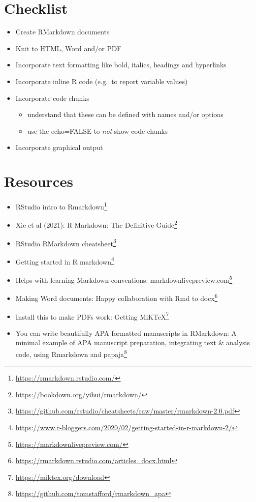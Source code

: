 \documentclass[
  12pt,
  a5paper,
]{book}
\DeclareRobustCommand{\href}[2]{#2\footnote{\url{#1}}}
\providecommand{\tightlist}{%
  \setlength{\itemsep}{0pt}\setlength{\parskip}{0pt}}
\begin{document}
\hypertarget{checklist-5}{%
\section{Checklist}\label{checklist-5}}

\begin{itemize}
\tightlist
\item
  Create RMarkdown documents
\item
  Knit to HTML, Word and/or PDF
\item
  Incorporate text formatting like bold, italics, headings and hyperlinks
\item
  Incorporate inline R code (e.g.~to report variable values)
\item
  Incorporate code chunks

  \begin{itemize}
  \tightlist
  \item
    understand that these can be defined with names and/or options
  \item
    use the echo=FALSE to \emph{not} show code chunks
  \end{itemize}
\item
  Incorporate graphical output
\end{itemize}

\hypertarget{resources-6}{%
\section{Resources}\label{resources-6}}

\begin{itemize}
\tightlist
\item
  \href{https://rmarkdown.rstudio.com/}{RStudio intro to Rmarkdown}
\item
  Xie et al (2021): \href{https://bookdown.org/yihui/rmarkdown/}{R Markdown: The Definitive Guide}
\item
  \href{https://github.com/rstudio/cheatsheets/raw/master/rmarkdown-2.0.pdf}{RStudio RMarkdown cheatsheet}
\item
  \href{https://www.r-bloggers.com/2020/02/getting-started-in-r-markdown-2/}{Getting started in R markdown}
\item
  Helps with learning Markdown conventions: \href{https://markdownlivepreview.com/}{markdownlivepreview.com}
\item
  Making Word documents: \href{https://rmarkdown.rstudio.com/articles_docx.html}{Happy collaboration with Rmd to docx}
\item
  Install this to make PDFs work: \href{https://miktex.org/download}{Getting MiKTeX}
\item
  You can write beautifully APA formatted manuscripts in RMarkdown: \href{https://github.com/tomstafford/rmarkdown_apa}{A minimal example of APA manuscript preparation, integrating text \& analysis code, using Rmarkdown and papaja}
\end{itemize}
\end{document}
